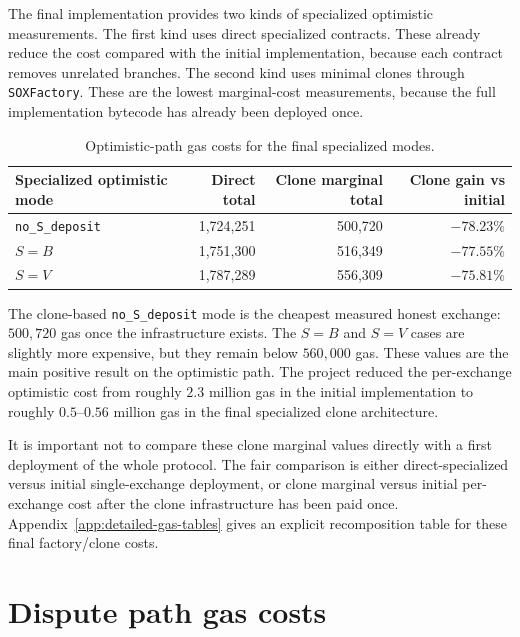 The final implementation provides two kinds of specialized optimistic measurements. The
first kind uses direct specialized contracts. These already reduce the cost compared with
the initial implementation, because each contract removes unrelated branches. The second
kind uses minimal clones through \texttt{SOXFactory}. These are the lowest marginal-cost
measurements, because the full implementation bytecode has already been deployed once.

\begin{table}[htbp]
  \centering
  \small
  \begin{tabularx}{\linewidth}{>{\raggedright\arraybackslash}Xrrr}
    \toprule
    Specialized optimistic mode & Direct total & Clone marginal total & Clone gain vs initial \\
    \midrule
    \texttt{no\_S\_deposit} & 1,724,251 & 500,720 & \(-78.23\%\) \\
    \(S=B\) & 1,751,300 & 516,349 & \(-77.55\%\) \\
    \(S=V\) & 1,787,289 & 556,309 & \(-75.81\%\) \\
    \bottomrule
  \end{tabularx}
  \caption{Optimistic-path gas costs for the final specialized modes.}
  \label{tab:optimistic-specialized-costs}
\end{table}

The clone-based \texttt{no\_S\_deposit} mode is the cheapest measured honest exchange:
\(500,720\) gas once the infrastructure exists. The \(S=B\) and \(S=V\) cases are slightly
more expensive, but they remain below \(560,000\) gas. These values are the main positive
result on the optimistic path. The project reduced the per-exchange optimistic cost from
roughly \(2.3\) million gas in the initial implementation to roughly \(0.5\)--\(0.56\)
million gas in the final specialized clone architecture.

It is important not to compare these clone marginal values directly with a first deployment
of the whole protocol. The fair comparison is either direct-specialized versus initial
single-exchange deployment, or clone marginal versus initial per-exchange cost after the
clone infrastructure has been paid once. Appendix~\ref{app:detailed-gas-tables} gives an
explicit recomposition table for these final factory/clone costs.

\section{Dispute path gas costs}

